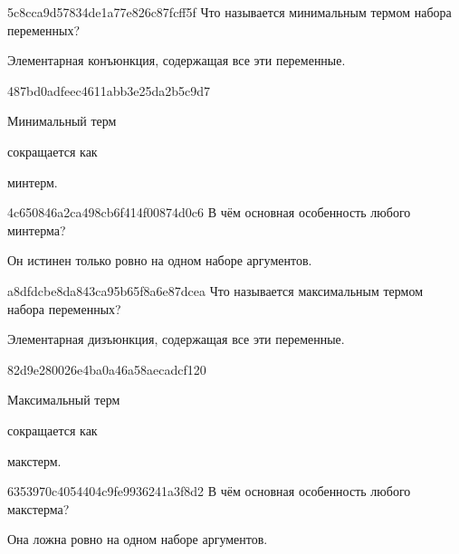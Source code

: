 \begin{note}{5c8cca9d57834de1a77e826c87fcff5f}
    Что называется минимальным термом набора переменных?

    \begin{cloze}{1}
        Элементарная конъюнкция, содержащая все эти переменные.
    \end{cloze}
\end{note}

\begin{note}{487bd0adfeec4611abb3e25da2b5c9d7}
    \begin{icloze}{2}Минимальный терм\end{icloze} сокращается как \begin{icloze}{1}минтерм.\end{icloze}
\end{note}

\begin{note}{4c650846a2ca498cb6f414f00874d0c6}
    В чём основная особенность любого минтерма?

    \begin{cloze}{1}
        Он истинен только ровно на одном наборе аргументов.
    \end{cloze}
\end{note}

\begin{note}{a8dfdcbe8da843ca95b65f8a6e87dcea}
    Что называется максимальным термом набора переменных?

    \begin{cloze}{1}
        Элементарная дизъюнкция, содержащая все эти переменные.
    \end{cloze}
\end{note}

\begin{note}{82d9e280026e4ba0a46a58aecadcf120}
    \begin{icloze}{2}Максимальный терм\end{icloze} сокращается как \begin{icloze}{1}макстерм.\end{icloze}
\end{note}

\begin{note}{6353970c4054404c9fe9936241a3f8d2}
    В чём основная особенность любого макстерма?

    \begin{cloze}{1}
        Она ложна ровно на одном наборе аргументов.
    \end{cloze}
\end{note}

